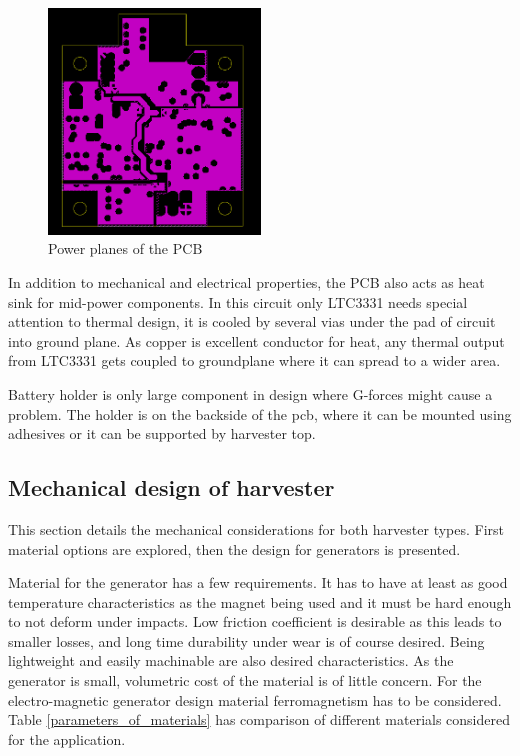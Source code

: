 \begin{figure}[htb]
  \begin{center}
    \includegraphics[height=6cm]{images/own_dwg/circuit/powerplane.jpg}
  \end{center}
  \caption{\label{fig:pcb_planes} Power planes of the PCB}
\end{figure}

In addition to mechanical and electrical properties, the PCB also acts as heat sink for mid-power components. In this circuit only LTC3331 needs special attention to thermal design, it is cooled by several vias under the pad of circuit into ground plane. As copper is excellent conductor for heat, any thermal output from LTC3331 gets coupled to groundplane where it can spread to a wider area.

Battery holder is only large component in design where G-forces might cause a problem. The holder is on the backside of the pcb, where it can be mounted using adhesives or it can be supported by harvester top.

\subsection{Mechanical design of harvester}
This section details the mechanical considerations for both harvester types. First material options are explored, then the design for generators is presented.

Material for the generator has a few requirements. It has to have at least as good temperature characteristics as the magnet being used and it must be hard enough to not deform under impacts. Low friction coefficient is desirable as this leads to smaller losses, and long time durability under wear is of course desired. Being lightweight and easily machinable are also desired characteristics. As the generator is small, volumetric cost of the material is of little concern. For the electro-magnetic generator design material ferromagnetism has to be considered. Table \ref{parameters_of_materials} has comparison of different materials considered for the application.

